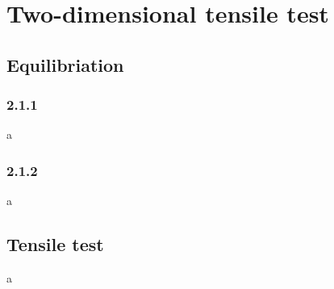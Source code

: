 \documentclass[10pt,a4paper]{report}
\begin{document}
\chapter{Two-dimensional tensile test}
\section{Equilibriation}
\subsection{2.1.1}
a
\subsection{2.1.2}
a

\section{Tensile test}
a
\end{document}
